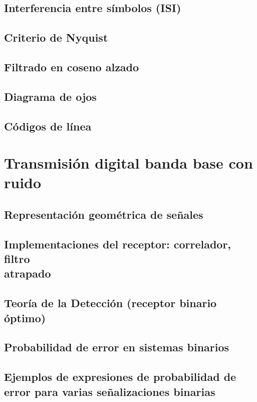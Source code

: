\documentclass[a4paper]{book}
\begin{document}
\section{Interferencia entre símbolos (ISI)}
\section{Criterio de Nyquist}
\section{Filtrado en coseno alzado}
\section{Diagrama de ojos}
\section{Códigos de línea}

\chapter{Transmisión digital banda base con ruido}
\section{Representación geométrica de señales}
\section{\texorpdfstring{Implementaciones del receptor: correlador, filtro\\ atrapado}{Implementaciones del receptor: correlador, filtro atrapado}}
\section{Teoría de la Detección (receptor binario óptimo)}
\section{Probabilidad de error en sistemas binarios}
\section[\texorpdfstring{Ejemplos de expresiones de probabilidad de error para varias\\ señalizaciones binarias}{Ejemplos de expresiones de probabilidad de error para varias señalizaciones binarias}]{Ejemplos de expresiones de probabilidad de error para varias señalizaciones binarias}
\end{document}
